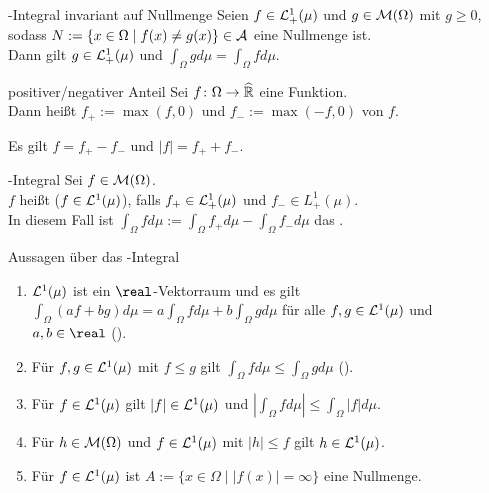 \begin{Satz}{-Integral invariant auf Nullmenge}
    Seien $f \in \mathcal{L}^1_+(\mu)$ und $g \in \mathcal{M}(\Omega)$ mit $g \ge 0$,
    sodass $N := \{x \in \Omega \;|\; f(x) \not= g(x)\} \in \mathcal{A}$ eine Nullmenge ist.\\
    Dann gilt $g \in \mathcal{L}^1_+(\mu)$ und $\int_\Omega g d\mu = \int_\Omega f d\mu$.
\end{Satz}

\linie
\pagebreak

\begin{Def}{positiver/negativer Anteil}
    Sei $f\colon \Omega \rightarrow \widehat{\mathbb{R}}$ eine Funktion.\\
    Dann heißt $f_+ := \max(f, 0)$  und
    $f_- := \max(-f, 0)$  von $f$.
\end{Def}

\begin{Bem}
    Es gilt $f = f_+ - f_-$ und $|f| = f_+ + f_-$.
\end{Bem}

\begin{Def}{-Integral}
    Sei $f \in \mathcal{M}(\Omega)$.\\
    $f$ heißt  ($f \in \mathcal{L}^1(\mu)$), falls
    $f_+ \in \mathcal{L}^1_+(\mu)$ und $f_- \in L^1_+(\mu)$.\\
    In diesem Fall ist $\int_\Omega f d\mu := \int_\Omega f_+ d\mu - \int_\Omega f_- d\mu$ das
    .
\end{Def}

\begin{Satz}{Aussagen über das -Integral}
    \begin{enumerate}
        \item
        $\mathcal{L}^1(\mu)$ ist ein $\real$-Vektorraum und es gilt
        $\int_\Omega (af + bg) d\mu = a \int_\Omega f d\mu + b \int_\Omega g d\mu$
        für alle $f, g \in \mathcal{L}^1(\mu)$ und $a, b \in \real$
        ().

        \item
        Für $f, g \in \mathcal{L}^1(\mu)$ mit $f \le g$ gilt
        $\int_\Omega f d\mu \le \int_\Omega g d\mu$
        ().

        \item
        Für $f \in \mathcal{L}^1(\mu)$ gilt $|f| \in \mathcal{L}^1(\mu)$ und
        $\left|\int_\Omega f d\mu\right| \le \int_\Omega |f| d\mu$.

        \item
        Für $h \in \mathcal{M}(\Omega)$ und $f \in \mathcal{L}^1(\mu)$ mit $|h| \le f$ gilt
        $h \in \mathcal{L}^1(\mu)$.

        \item
        Für $f \in \mathcal{L}^1(\mu)$ ist $A := \{x \in \Omega \;|\; |f(x)| = \infty\}$ eine Nullmenge.
    \end{enumerate}
\end{Satz}

